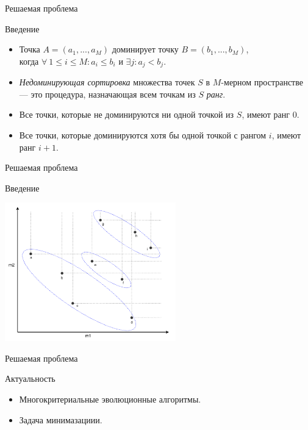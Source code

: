 \documentclass{beamer}
\begin{document}
\begin{frame}{Решаемая проблема}
\begin{block}{Введение}
\begin{itemize}
\item Точка $A=(a_1,...,a_M)$ доминирует точку $B=(b_1,...,b_M)$, \\
когда $\forall ~ 1 \leq i \leq M : a_i \leq b_i$ и $\exists j : a_j < b_j $.
\item \textit{Недоминирующая сортировка} множества точек $S$ в $M$-мерном пространстве — это процедура, назначающая всем точкам из $S$ \textit{ранг}.
\item Все точки, которые не доминируются ни одной точкой из $S$, имеют ранг 0.
\item Все точки, которые доминируются хотя бы одной точкой с рангом $i$, имеют ранг $i+1$. %
\end{itemize}
\end{block}
\end{frame}


\begin{frame}{Решаемая проблема}
\begin{block}{Введение}
\begin{center}
\includegraphics*[height=6cm]{pic/non_dominated_sort.png}
\end{center}
\end{block}
\end{frame}

\begin{frame}{Решаемая проблема}
\begin{block}{Актуальность}
\begin{itemize}
\item Многокритериальные эволюционные алгоритмы. 
\item Задача минимазациии.
\end{itemize}
\end{block}
\end{frame}
\end{document}
